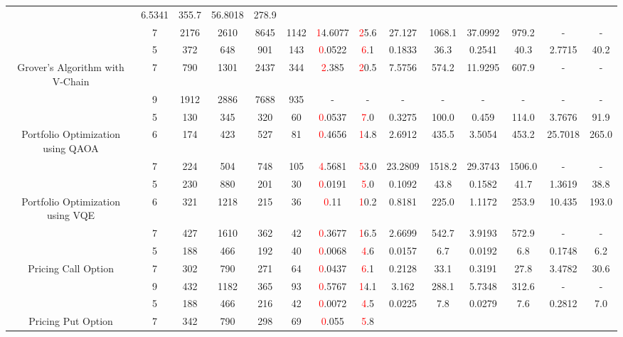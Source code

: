 \begin{table}[htb]
{\begin{tabular}{|c|c|c|c|c|c|c|c|c|c|c|c|c|c|}
 & 6.5341 & 355.7
 & 56.8018 & 278.9
 \\
 & 
7 & 2176 & 2610 & 8645 & 1142
 & \textcolor{red}14.6077 & \textcolor{red}25.6
 & 27.127 & 1068.1
 & 37.0992 & 979.2
 & - & -
 \\
\hline
 & 
5 & 372 & 648 & 901 & 143
 & \textcolor{red}0.0522 & \textcolor{red}6.1
 & 0.1833 & 36.3
 & 0.2541 & 40.3
 & 2.7715 & 40.2
 \\
Grover's Algorithm with V-Chain & 
7 & 790 & 1301 & 2437 & 344
 & \textcolor{red}2.385 & \textcolor{red}20.5
 & 7.5756 & 574.2
 & 11.9295 & 607.9
 & - & -
 \\
 & 
9 & 1912 & 2886 & 7688 & 935
 & - & -
 & - & -
 & - & -
 & - & -
 \\
\hline
 & 
5 & 130 & 345 & 320 & 60
 & \textcolor{red}0.0537 & \textcolor{red}7.0
 & 0.3275 & 100.0
 & 0.459 & 114.0
 & 3.7676 & 91.9
 \\
Portfolio Optimization using QAOA & 
6 & 174 & 423 & 527 & 81
 & \textcolor{red}0.4656 & \textcolor{red}14.8
 & 2.6912 & 435.5
 & 3.5054 & 453.2
 & 25.7018 & 265.0
 \\
 & 
7 & 224 & 504 & 748 & 105
 & \textcolor{red}4.5681 & \textcolor{red}53.0
 & 23.2809 & 1518.2
 & 29.3743 & 1506.0
 & - & -
 \\
\hline
 & 
5 & 230 & 880 & 201 & 30
 & \textcolor{red}0.0191 & \textcolor{red}5.0
 & 0.1092 & 43.8
 & 0.1582 & 41.7
 & 1.3619 & 38.8
 \\
Portfolio Optimization using VQE & 
6 & 321 & 1218 & 215 & 36
 & \textcolor{red}0.11 & \textcolor{red}10.2
 & 0.8181 & 225.0
 & 1.1172 & 253.9
 & 10.435 & 193.0
 \\
 & 
7 & 427 & 1610 & 362 & 42
 & \textcolor{red}0.3677 & \textcolor{red}16.5
 & 2.6699 & 542.7
 & 3.9193 & 572.9
 & - & -
 \\
\hline
 & 
5 & 188 & 466 & 192 & 40
 & \textcolor{red}0.0068 & \textcolor{red}4.6
 & 0.0157 & 6.7
 & 0.0192 & 6.8
 & 0.1748 & 6.2
 \\
Pricing Call Option & 
7 & 302 & 790 & 271 & 64
 & \textcolor{red}0.0437 & \textcolor{red}6.1
 & 0.2128 & 33.1
 & 0.3191 & 27.8
 & 3.4782 & 30.6
 \\
 & 
9 & 432 & 1182 & 365 & 93
 & \textcolor{red}0.5767 & \textcolor{red}14.1
 & 3.162 & 288.1
 & 5.7348 & 312.6
 & - & -
 \\
\hline
 & 
5 & 188 & 466 & 216 & 42
 & \textcolor{red}0.0072 & \textcolor{red}4.5
 & 0.0225 & 7.8
 & 0.0279 & 7.6
 & 0.2812 & 7.0
 \\
Pricing Put Option & 
7 & 342 & 790 & 298 & 69
 & \textcolor{red}0.055 & \textcolor{red}5.8

\end{tabular}}
\end{table}
